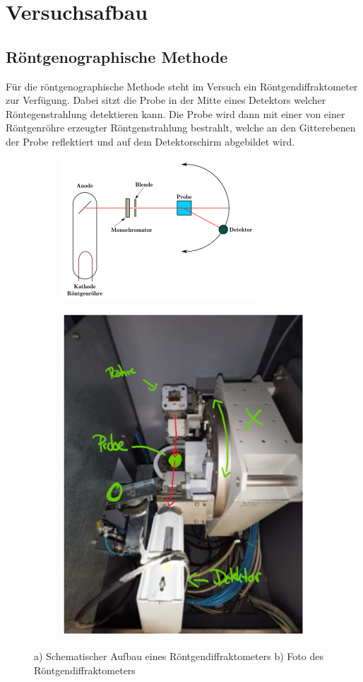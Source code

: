 \section{Versuchsafbau}
    \subsection*{Röntgenographische Methode}
    Für die röntgenographische Methode steht im Versuch ein Röntgendiffraktometer zur Verfügung.
    Dabei sitzt die Probe in der Mitte eines Detektors welcher Röntegenstrahlung detektieren kann.
    Die Probe wird dann mit einer von einer Röntgenröhre erzeugter Röntgenstrahlung bestrahlt, welche
    an den Gitterebenen der Probe reflektiert und auf dem Detektorschirm abgebildet wird.
    \begin{figure}[H]
        \centering
        \begin{subfigure}{.5\textwidth}
        \centering
        \includegraphics[width=.8\linewidth]{images/diffraktometer.png}
        \caption{}
        \label{fig:sub1}
        \end{subfigure}%
        \begin{subfigure}{.5\textwidth}
        \centering
        \includegraphics[width=.6\linewidth]{images/diffraktometer_pic.png}
        \caption{}
        \label{fig:sub2}
        \end{subfigure}
        \caption{a) Schematischer Aufbau eines Röntgendiffraktometers b) Foto des Röntgendiffraktometers}
        \label{fig:test}
    \end{figure}
